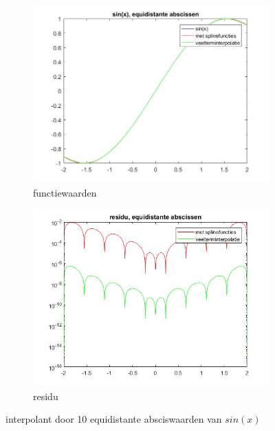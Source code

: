 \begin{figure}[H]
\centering
\begin{subfigure}{.5\textwidth}
  \centering
  \includegraphics[width=\linewidth]{afbeeldingen/sin_equi.jpg}
  \caption{functiewaarden}
\end{subfigure}%
\begin{subfigure}{.5\textwidth}
  \centering
  \includegraphics[width=\linewidth]{afbeeldingen/sin_equi_res.jpg}
  \caption{residu}
\end{subfigure}
\caption{interpolant door 10 equidistante absciswaarden van $sin(x)$}
\label{fig:sinequi}
\end{figure}

